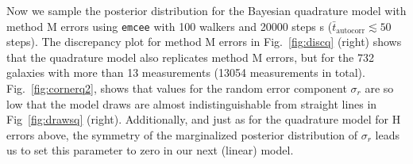\documentclass[a4paper,fleqn,usenatbib]{mnras}
\begin{document}
Now we sample the posterior distribution for the Bayesian quadrature model with method M errors using \texttt{emcee} with 100 walkers and 20000 steps s ($\bar{t}_\mathrm{autocorr} \lesssim 50$ steps). The discrepancy plot for method M errors in Fig.~\ref{fig:discq} (right) shows that the quadrature model also replicates method M errors, but for the 732 galaxies with more than 13 measurements (13054 measurements in total). Fig.~\ref{fig:cornerq2}, shows that values for the random error component $\sigma_r$ are so low that the model draws are almost indistinguishable from straight lines in Fig~\ref{fig:drawsq} (right). Additionally, and just as for the quadrature model for H errors above, the symmetry of the marginalized posterior distribution of $\sigma_r$ leads us to set this parameter to zero in our next (linear) model.
\end{document}
